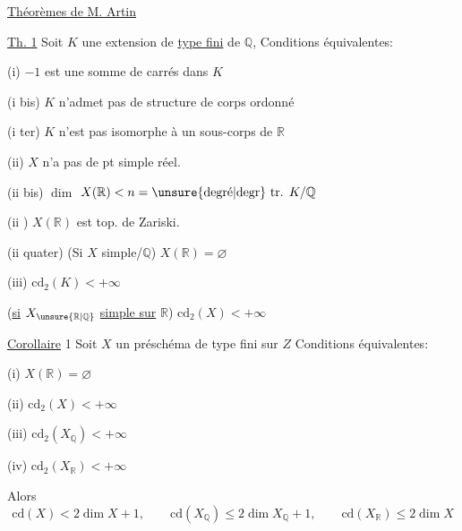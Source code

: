 \uline{Théorèmes de M. Artin}

\uline{Th. 1} Soit $K$ une extension de \uline{type fini} de $\mathbb Q$, Conditions
équivalentes:

(i) $-1$ est une somme de carrés dans $K$

(i bis) $K$ n'admet pas de structure de corps ordonné

(i ter) $K$ n'est pas isomorphe à un sous-corps de $\mathbb R$

(ii)  $X$  n'a pas de pt simple réel.


(ii bis) 
$\dim$
$X(\mathbb R)<n=\text{\unsure{degré|degr} tr. }K/\mathbb Q$

(ii ) $X(\mathbb R)$ est  top. de Zariski.

(ii quater) (Si $X$ simple/$\mathbb Q$) \quad $X(\mathbb R)=\varnothing$

(iii) $\mathrm{cd}_2(K)<+\infty$

(\uline{si} $X_{\unsure{\mathbb R|\mathbb Q}}$ \uline{simple sur} $\mathbb R$) \quad $\mathrm{cd}_2(X)<+\infty$

\uline{Corollaire} 1 Soit $X$ un préschéma de type fini sur $Z$
 Conditions équivalentes:

(i) $X(\mathbb R)=\varnothing$

(ii) $\mathrm{cd}_2(X)<+\infty$


(iii) $\mathrm{cd}_2(X_{\mathbb Q})<+\infty$


(iv) $\mathrm{cd}_2(X_{\mathbb R})<+\infty$

Alors
\[
\mathrm{cd}(X)<2\dim X+1,\qquad
\mathrm{cd}(X_{\mathbb Q})\leq2\dim X_{\mathbb Q}+1,
\qquad\mathrm{cd}(X_{\mathbb R})\leq2\dim X
\]

